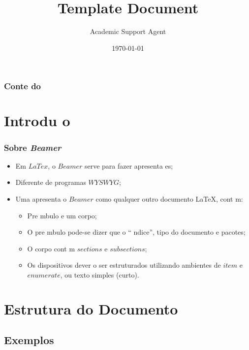 \documentclass{article}
\title{Template Document}
\author{Academic Support Agent}
\date{\today}
\begin{document}
\maketitle

\maketitle


\begin{frame}
    \frametitle{Conte do}
    
\end{frame}

\section{Introdu o}


\begin{frame}
    \frametitle{Sobre \emph{Beamer}}
\begin{itemize}
    \item Em $LaTex$, o $Beamer$ serve para fazer apresenta es;
    \item  Diferente de programas $WYSWYG$;
    \item  Uma apresenta o $Beamer$   como qualquer outro documento LaTeX, cont m:
    \begin{itemize}
        \item Pre mbulo e um corpo;
        \item O pre mbulo pode-se dizer que   o `` ndice'', tipo do documento e pacotes;
        \item O corpo cont m $sections$ e $subsections$;
        \item Os dispositivos dever o ser estruturados utilizando ambientes de $item$ e $enumerate$, ou texto simples (curto).
\end{itemize} 
\end{itemize}
\end{frame}

\section{Estrutura do Documento}
\subsection{Exemplos}
\end{document}
